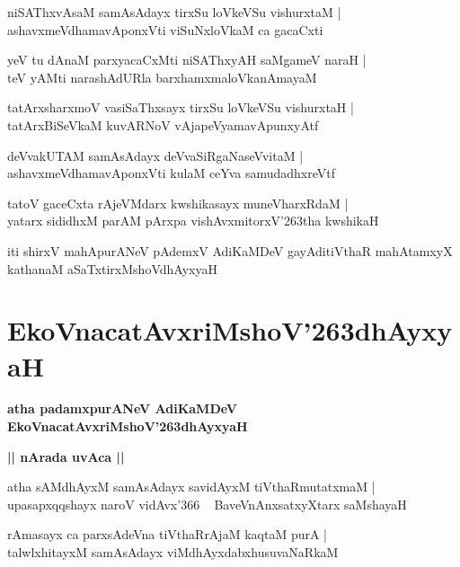 \documentclass[twoside,12pt,openright]{book}
\def\S{\char'263}
\newcounter{shloka}[chapter]
\def\uvaca#1{\centerline{{\large\textbf{#1}}}}
\begin{document}
\begin{shloka}
niSAThxvAsaM samAsAdayx tirxSu loVkeVSu vishurxtaM |\\
ashavxmeVdhamavAponxVti viSuNxloVkaM ca gacaCxti 
\end{shloka}

\begin{shloka}
yeV tu dAnaM parxyacaCxMti niSAThxyAH saMgameV naraH |\\
teV yAMti narashAdURla barxhamxmaloVkanAmayaM 
\end{shloka}

\begin{shloka}
tatArxsharxmoV vasiSaThxsayx tirxSu loVkeVSu vishurxtaH |\\
tatArxBiSeVkaM kuvARNoV vAjapeVyamavApunxyAtf 
\end{shloka}

\begin{shloka}
deVvakUTAM samAsAdayx deVvaSiRgaNaseVvitaM |\\
ashavxmeVdhamavAponxVti kulaM ceYva samudadhxreVtf 
\end{shloka}

\begin{shloka}
tatoV gaceCxta rAjeVMdarx kwshikasayx muneVharxRdaM |\\
yatarx sididhxM parAM pArxpa vishAvxmitorxV\S tha kwshikaH 
\end{shloka}

\begin{center}
iti shirxV mahApurANeV pAdemxV AdiKaMDeV gayAditiVthaR mahAtamxyX kathanaM aSaTxtirxMshoVdhAyxyaH
\end{center}

\chapter{EkoVnacatAvxriMshoV\S dhAyxyaH}

\begin{center}
{\LARGE\bfseries atha padamxpurANeV AdiKaMDeV EkoVnacatAvxriMshoV\S dhAyxyaH}
\end{center}

\uvaca{ || nArada uvAca || }


\begin{shloka}
atha sAMdhAyxM samAsAdayx savidAyxM tiVthaRmutatxmaM |\\
upasapxqqshayx naroV vidAvx\char'366 ~ BaveVnAnxsatxyXtarx saMshayaH 
\end{shloka}

\begin{shloka}
rAmasayx ca parxsAdeVna tiVthaRrAjaM kaqtaM purA |\\
talwlxhitayxM samAsAdayx viMdhAyxdabxhusuvaNaRkaM 
\end{shloka}
\end{document}
